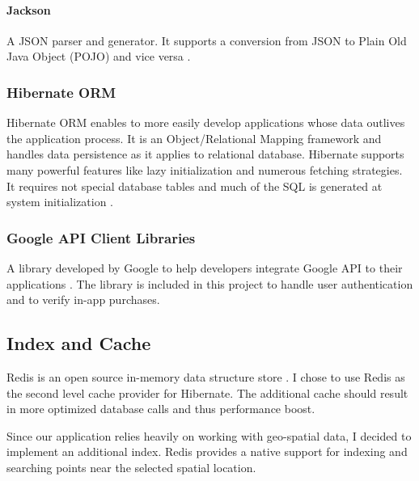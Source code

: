 			\paragraph*{Jackson} 
				A JSON parser and generator. It supports a conversion from JSON to Plain Old Java Object (POJO) and vice versa \cite{jackson}.			
		\subsubsection{Hibernate ORM}
		Hibernate ORM enables to more easily develop applications whose data outlives the application process. It is an Object/Relational Mapping framework and handles data persistence as it applies to relational database. Hibernate supports many powerful features like lazy initialization and numerous fetching strategies. It requires not special database tables and much of the SQL is generated at system initialization \cite{hibernate}.
		
		\subsubsection{Google API Client Libraries}
		A library developed by Google to help developers integrate Google API to their applications \cite{googleapilibs}. The library is included in this project to handle user authentication and to verify in-app purchases.
		
	\subsection{Index and Cache}
	Redis is an open source in-memory data structure store \cite{redis}. I chose to use Redis as the second level cache provider for Hibernate. The additional cache should result in more optimized database calls and thus performance boost.
	
	Since our application relies heavily on working with geo-spatial data, I decided to implement an additional index. Redis provides a native support for indexing and  searching points near the selected spatial location.		